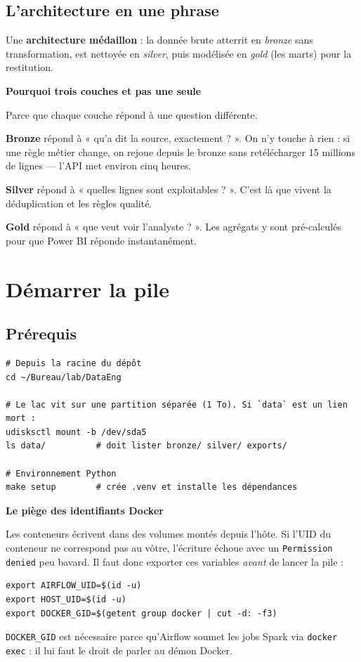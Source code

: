 \documentclass[11pt,a4paper]{article}
\newcommand{\cmd}[1]{\texttt{\small #1}}
\newcommand{\titrebloc}[1]{\textbf{\color{encre}#1}\par\vspace{0.25em}}
\begin{document}
\subsection{L'architecture en une phrase}

Une \textbf{architecture médaillon} : la donnée brute atterrit en
\emph{bronze} sans transformation, est nettoyée en \emph{silver}, puis
modélisée en \emph{gold} (les marts) pour la restitution.

\begin{pourquoi}
\titrebloc{Pourquoi trois couches et pas une seule}
Parce que chaque couche répond à une question différente.

\textbf{Bronze} répond à « qu'a dit la source, exactement ? ». On n'y touche
à rien : si une règle métier change, on rejoue depuis le bronze sans
retélécharger 15 millions de lignes — l'API met environ cinq heures.

\textbf{Silver} répond à « quelles lignes sont exploitables ? ». C'est là que
vivent la déduplication et les règles qualité.

\textbf{Gold} répond à « que veut voir l'analyste ? ». Les agrégats y sont
pré-calculés pour que Power BI réponde instantanément.
\end{pourquoi}

\newpage
\section{Démarrer la pile}

\subsection{Prérequis}

\begin{lstlisting}[style=sh]
# Depuis la racine du dépôt
cd ~/Bureau/lab/DataEng

# Le lac vit sur une partition séparée (1 To). Si `data` est un lien mort :
udisksctl mount -b /dev/sda5
ls data/          # doit lister bronze/ silver/ exports/

# Environnement Python
make setup        # crée .venv et installe les dépendances
\end{lstlisting}

\begin{attention}
\titrebloc{Le piège des identifiants Docker}
Les conteneurs écrivent dans des volumes montés depuis l'hôte. Si l'UID du
conteneur ne correspond pas au vôtre, l'écriture échoue avec un
\cmd{Permission denied} peu bavard. Il faut donc exporter ces variables
\emph{avant} de lancer la pile :

\begin{lstlisting}[style=sh]
export AIRFLOW_UID=$(id -u)
export HOST_UID=$(id -u)
export DOCKER_GID=$(getent group docker | cut -d: -f3)
\end{lstlisting}

\cmd{DOCKER\_GID} est nécessaire parce qu'Airflow soumet les jobs Spark via
\cmd{docker exec} : il lui faut le droit de parler au démon Docker.
\end{attention}
\end{document}
